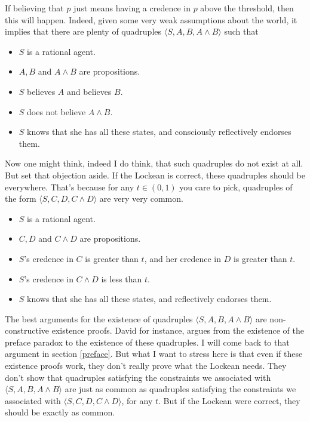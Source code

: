 \documentclass[11pt,]{book}
\providecommand{\tightlist}{%
  \setlength{\itemsep}{0pt}\setlength{\parskip}{0pt}}
\begin{document}
If believing that \(p\) just means having a credence in \(p\) above the threshold, then this will happen. Indeed, given some very weak assumptions about the world, it implies that there are plenty of quadruples \(\langle S, A, B, A \wedge B \rangle\) such that

\begin{itemize}
\tightlist
\item
  \(S\) is a rational agent.
\item
  \(A, B\) and \(A \wedge B\) are propositions.
\item
  \(S\) believes \(A\) and believes \(B\).
\item
  \(S\) does not believe \(A \wedge B\).
\item
  \(S\) knows that she has all these states, and consciously reflectively
  endorses them.
\end{itemize}

Now one might think, indeed I do think, that such quadruples do not exist at all. But set that objection aside. If the Lockean is correct, these quadruples should be everywhere. That's because for any \(t \in (0, 1)\) you care to pick, quadruples of the form \(\langle S, C, D, C \wedge D \rangle\) are very very common.

\begin{itemize}
\tightlist
\item
  \(S\) is a rational agent.
\item
  \(C, D\) and \(C \wedge D\) are propositions.
\item
  \(S\)'s credence in \(C\) is greater than \(t\), and her credence in \(D\) is greater than \(t\).
\item
  \(S\)'s credence in \(C \wedge D\) is less than \(t\).
\item
  \(S\) knows that she has all these states, and reflectively endorses them.
\end{itemize}

The best arguments for the existence of quadruples \(\langle S, A, B, A \wedge B \rangle\) are non-constructive existence proofs. David \citet{Christensen2005} for instance, argues from the existence of the preface paradox to the existence of these quadruples. I will come back to that argument in section \ref{preface}. But what I want to stress here is that even if these existence proofs work, they don't really prove what the Lockean needs. They don't show that quadruples satisfying the constraints we associated with \(\langle S, A, B, A \wedge B \rangle\) are just as common as quadruples satisfying the constraints we associated with \(\langle S, C, D, C \wedge D \rangle\), for any \(t\). But if the Lockean were correct, they should be exactly as common.
\end{document}
